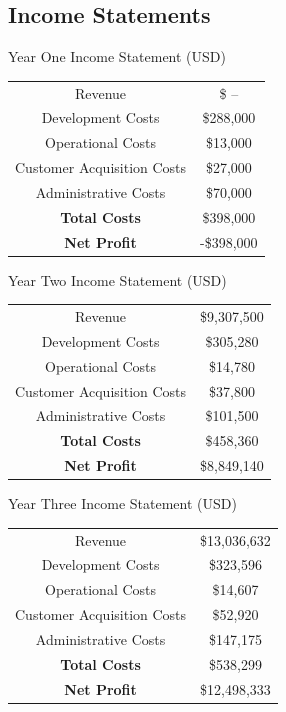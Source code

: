 \documentclass[12pt]{article}
\begin{document}
\subsection{Income Statements}
\vspace{1.5cm}
\begin{center}
	Year One Income Statement (USD) \\[1.5ex]
	
	\begin{tabular}{c | c}
	Revenue & \$ -- \\
	Development Costs & \$288,000 \\
	Operational Costs & \$13,000 \\
	Customer Acquisition Costs & \$27,000 \\
	Administrative Costs & \$70,000 \\
	\textbf{Total Costs} & \$398,000 \\
	\textbf{Net Profit} & -\$398,000
	\end{tabular}
\end{center}
\vspace{1.5cm}
\begin{center}
	Year Two Income Statement (USD) \\[1.5ex]
	
	\begin{tabular}{c | c}
	Revenue & \$9,307,500  \\
	Development Costs & \$305,280 \\
	Operational Costs & \$14,780 \\
	Customer Acquisition Costs & \$37,800 \\
	Administrative Costs & \$101,500 \\
	\textbf{Total Costs} & \$458,360 \\
	\textbf{Net Profit} & \$8,849,140
	\end{tabular}
\end{center}
\vspace{1.5cm}
\pagebreak
\begin{center}
	Year Three Income Statement (USD) \\[1.5ex]
	
	\begin{tabular}{c | c}
	Revenue & \$13,036,632 \\
	Development Costs & \$323,596 \\
	Operational Costs & \$14,607 \\
	Customer Acquisition Costs & \$52,920 \\
	Administrative Costs & \$147,175 \\
	\textbf{Total Costs} & \$538,299 \\
	\textbf{Net Profit} & \$12,498,333
	\end{tabular}
\end{center}
\end{document}
